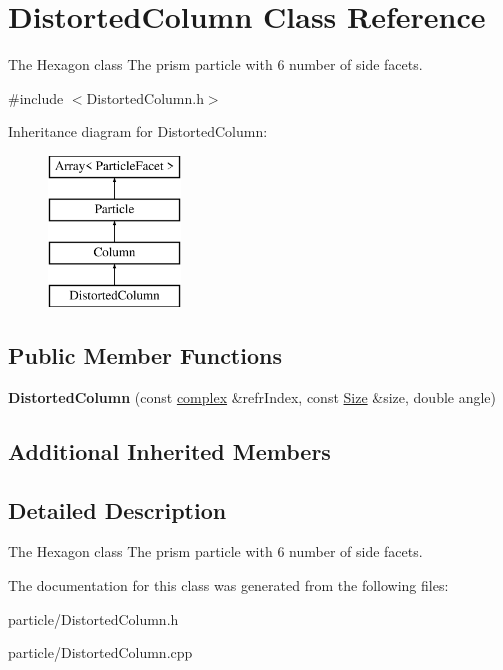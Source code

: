 \hypertarget{class_distorted_column}{}\section{Distorted\+Column Class Reference}
\label{class_distorted_column}


The Hexagon class The prism particle with 6 number of side facets.  




{\ttfamily \#include $<$Distorted\+Column.\+h$>$}

Inheritance diagram for Distorted\+Column\+:\begin{figure}[H]
\begin{center}
\leavevmode
\includegraphics[height=4.000000cm]{class_distorted_column}
\end{center}
\end{figure}
\subsection*{Public Member Functions}
\begin{DoxyCompactItemize}
\item 
\mbox{\label{class_distorted_column_a7cc0f6c72403bd2de255297fccbbf92c}} 
{\bfseries Distorted\+Column} (const \mbox{\hyperlink{classcomplex}{complex}} \&refr\+Index, const \mbox{\hyperlink{struct_size}{Size}} \&size, double angle)
\end{DoxyCompactItemize}
\subsection*{Additional Inherited Members}


\subsection{Detailed Description}
The Hexagon class The prism particle with 6 number of side facets. 

The documentation for this class was generated from the following files\+:\begin{DoxyCompactItemize}
\item 
particle/Distorted\+Column.\+h\item 
particle/Distorted\+Column.\+cpp\end{DoxyCompactItemize}
